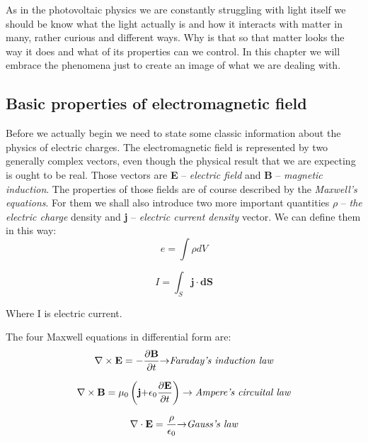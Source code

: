 As in the photovoltaic physics we are constantly struggling with light itself we should be know what the light actually is and how it interacts with matter in many, rather curious and different ways. Why is that so that matter looks the way it does and what of its properties can we control. In this chapter we will embrace the phenomena just to create an image of what we are dealing with. 

\subsection{Basic properties of electromagnetic field}

\indent Before we actually begin we need to state some classic information about
the physics of electric charges. The electromagnetic field is
represented by two generally complex vectors, even though the physical
result that we are expecting is ought to be real. Those vectors are
\textbf{E} -- \emph{electric field} and \textbf{B} -- \emph{magnetic
induction}. The properties of those fields are of course described by
the \emph{Maxwell's equations}. For them we shall also introduce two
more important quantities \(\rho\) -- \emph{the electric charge} density
and \textbf{j} -- \emph{electric current density} vector.
We can define them in this way:
\begin{equation}
e = \int\rho dV
\end{equation}

\begin{equation}
I = \int_{S}^{}\mathbf{j \cdot dS}
\end{equation}

\noindent Where I is electric current.

\noindent The four Maxwell equations in differential form are:
\begin{equation}
\nabla \times \mathbf{E} = -\frac{\partial\mathbf{B}}{\partial t}\mathbf{\rightarrow}
\emph{Faraday's induction law}
\end{equation}

\begin{equation}
\nabla \times \mathbf{B}=\mu_{0}\left( \mathbf{j +}\epsilon_{0}\frac{\partial\mathbf{E}}{\partial t} \right) \rightarrow
\emph{Ampere's circuital law}
\end{equation}

\begin{equation}
\nabla \cdot \mathbf{E}=\frac{\rho}{\epsilon_{0}}\mathbf{\rightarrow}
\emph{Gauss's law}
\end{equation}

